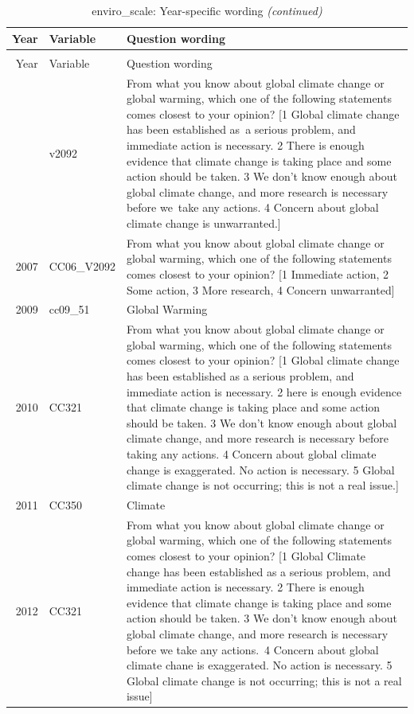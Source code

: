 \documentclass[12pt]{article}
\begin{document}
\begin{longtable}[t]{rl>{\raggedright\arraybackslash}p{10cm}}
\caption{\label{tab:unnamed-chunk-4}enviro\_scale: Year-specific wording}\\
\toprule
Year & Variable & Question wording\\
\midrule
\endfirsthead
\caption[]{enviro\_scale: Year-specific wording \textit{(continued)}}\\
\toprule
Year & Variable & Question wording\\
\midrule
\endhead
\
\endfoot
\bottomrule
\endlastfoot
2006 & v2092 & From what you know about global climate change or global warming, which one of the following statements comes closest to your opinion? [1 Global climate change has been established as a serious problem, and immediate action is necessary. 2 There is enough evidence that climate change is taking place and some action should be taken. 3 We don't know enough about global climate change, and more research is necessary before we take any actions. 4 Concern about global climate change is unwarranted.]\\
2007 & CC06\_V2092 & From what you know about global climate change or global warming, which one of the following statements comes closest to your opinion? [1 Immediate action, 2 Some action, 3 More research, 4 Concern unwarranted]\\
2009 & cc09\_51 & Global Warming\\
2010 & CC321 & From what you know about global climate change or global warming, which one of the following statements comes closest to your opinion? [1 Global climate change has been established as a serious problem, and immediate action is necessary. 2 here is enough evidence that climate change is taking place and some action should be taken. 3 We don’t know enough about global climate change, and more research is necessary before taking any actions. 4 Concern about global climate change is exaggerated. No action is necessary. 5 Global climate change is not occurring; this is not a real issue.]\\
2011 & CC350 & Climate\\
2012 & CC321 & From what you know about global climate change or global warming, which one of the following statements comes closest to your opinion? [1 Global Climate change has been established as a serious problem, and immediate action is necessary. 2 There is enough evidence that climate change is taking place and some action should be taken. 3 We don't know enough about global climate change, and more research is necessary before we take any actions. 4 Concern about global climate chane is exaggerated. No action is necessary. 5 Global climate change is not occurring; this is not a real issue]\\*
\end{longtable}
\end{document}
